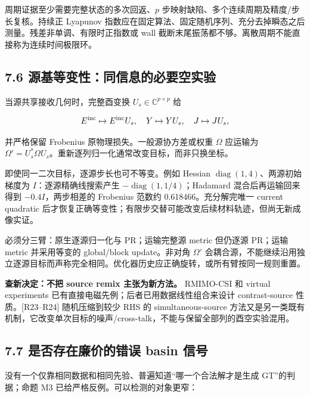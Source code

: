 \documentclass[11pt,a4paper]{article}
\begin{document}
周期证据至少需要完整状态的多次回返、\(p\)
步映射缺陷、多个连续周期及精度/步长复核。持续正 Lyapunov
指数应在固定算法、固定随机序列、充分去掉瞬态之后测量。残差非单调、有限时正指数或
wall 截断末尾振荡都不够。离散周期不能直接称为连续时间极限环。

\hypertarget{ux6e90ux57faux7b49ux53d8ux6027ux540cux4fe1ux606fux7684ux5fc5ux8981ux7a7aux5b9eux9a8c}{%
\subsection{7.6
源基等变性：同信息的必要空实验}\label{ux6e90ux57faux7b49ux53d8ux6027ux540cux4fe1ux606fux7684ux5fc5ux8981ux7a7aux5b9eux9a8c}}

当源共享接收几何时，完整酉变换 \(U_s\in\mathbb C^{p\times p}\) 给

\[
E^{\rm inc}\mapsto E^{\rm inc}U_s,\quad
Y\mapsto YU_s,\quad J\mapsto JU_s,
\]

并严格保留 Frobenius 原物理损失。一般源协方差或权重 \(\Omega\) 应运输为
\(\Omega'=U_s^*\Omega U_s\)。重新逐列归一化通常改变目标，而非只换坐标。

即使同一二次目标，逐源步长也可不等变。例如 Hessian
\(\operatorname{diag}(1,4)\)、两源初始梯度为 \(I\)：逐源精确线搜索产生
\(-\operatorname{diag}(1,1/4)\)；Hadamard 混合后再运输回来得到
\(-0.4I\)，两步相差的 Frobenius 范数约 0.618466。充分解完唯一 current
quadratic
后才恢复正确等变性；有限步交替可能改变后续材料轨迹，但尚无新成像实证。

必须分三臂：原生逐源归一化与 PR；运输完整源 metric 但仍逐源 PR；运输
metric 并采用等变的 global/block update。非对角 \(\Omega'\)
会耦合源，不能继续沿用独立逐源目标而声称完全相同。优化器历史应正确旋转，或所有臂按同一规则重置。

\textbf{查新决定：不把 source remix 主张为新方法。} RMIMO-CSI 和 virtual
experiments 已有直接电磁先例；后者已用数据线性组合来设计 contrast-source
性质。{[}R23--R24{]} 随机压缩到较少 RHS 的 simultaneous-source
方法又是另一类既有机制，它改变单次目标的噪声/cross-talk，不能与保留全部列的酉空实验混用。

\hypertarget{ux662fux5426ux5b58ux5728ux5ec9ux4ef7ux7684ux9519ux8bef-basin-ux4fe1ux53f7}{%
\subsection{7.7 是否存在廉价的错误 basin
信号}\label{ux662fux5426ux5b58ux5728ux5ec9ux4ef7ux7684ux9519ux8bef-basin-ux4fe1ux53f7}}

没有一个仅靠相同数据和相同先验、普遍知道``哪一个合法解才是生成
GT''的判据；命题 M3 已给严格反例。可以检测的对象更窄：
\end{document}
